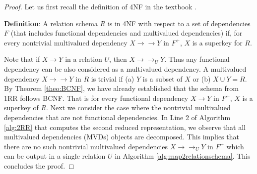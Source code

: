 \begin{proof} Let us first recall the definition of 4NF in the textbook \cite{elmasri2000fundamentals}.

\textbf{Definition}: A relation schema $R$ is in 4NF with respect to a set of dependencies $F$ (that includes functional dependencies and multivalued dependencies) if, for every nontrivial multivalued dependency $X \to \to Y$ in $F^+$, $X$ is a superkey for $R$.

Note that if $X \to Y$ in a relation $U$, then $X \to \to_U Y$. Thus any functional dependency can be also considered as a multivalued dependency. A multivalued dependency $X \to\to Y$ in $R$ is  trivial  if (a) $Y$ is a subset of $X$ or (b) $X \cup Y = R$.   By Theorem \ref{theo:BCNF}, we have already established that the  schema from 1RR follows BCNF.  That is for every functional dependency $X \to Y$ in $F^+$, $X$ is a superkey of $R$. Next we consider the case where the nontrivial multivalued dependencies that are not functional dependencies. In Line 2 of Algorithm \ref{alg:2RR} that computes the second reduced representation, we observe that all multivalued dependencies (MVDs) objects are decomposed.  This implies that there are no such nontrivial multivalued dependencies  $X \to \to_U Y$ in $F^+$ which can be output in a single relation $U$ in Algorithm \ref{alg:map2relationschema}. This concludes the proof.
\end{proof}




